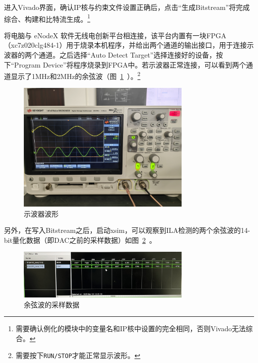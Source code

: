进入Vivado界面，确认IP核与约束文件设置正确后，点击“生成Bitstream”将完成综合、构建和比特流生成。\footnote{需要确认例化的模块中的变量名和IP核中设置的完全相同，否则Vivado无法综合。}

将电脑与 eNodeX 软件无线电创新平台相连接，该平台内置有一块FPGA（xc7z020clg484-1）用于烧录本机程序，并给出两个通道的输出接口，用于连接示波器的两个通道。之后选择“Auto Detect Target”选择连接好的设备，按下“Program Device”将程序烧录到FPGA中。若示波器正常连接，可以看到两个通道显示了1MHz和2MHz的余弦波（图~\ref{fig:exp3:waveform}~）。\footnote{需要按下\texttt{RUN/STOP}才能正常显示波形。}

\begin{figure}[htbp]
  \centering
  \includegraphics[width=0.75\textwidth]{figure/exp3/waveform.jpg}
  \caption{示波器波形}
  \label{fig:exp3:waveform}
\end{figure}

另外，在写入Bitstream之后，启动xsim，可以观察到ILA检测的两个余弦波的14-bit量化数据（即DAC之前的采样数据）如图~\ref{fig:exp3:sim}~。
\begin{figure}[htbp]
  \centering
  \includegraphics[width=0.75\textwidth]{figure/exp3/sim.png}
  \caption{余弦波的采样数据}
  \label{fig:exp3:sim}
\end{figure}
